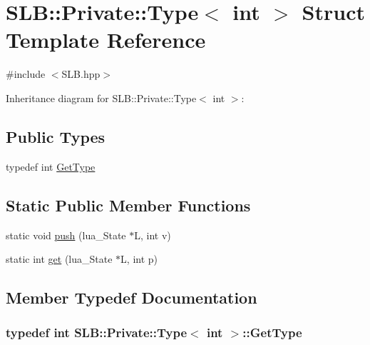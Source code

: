 \hypertarget{structSLB_1_1Private_1_1Type_3_01int_01_4}{}\section{S\+LB\+:\+:Private\+:\+:Type$<$ int $>$ Struct Template Reference}
\label{structSLB_1_1Private_1_1Type_3_01int_01_4}


{\ttfamily \#include $<$S\+L\+B.\+hpp$>$}



Inheritance diagram for S\+LB\+:\+:Private\+:\+:Type$<$ int $>$\+:
\subsection*{Public Types}
\begin{DoxyCompactItemize}
\item 
typedef int \hyperlink{structSLB_1_1Private_1_1Type_3_01int_01_4_afcb454aed68183a3daf14f9e1760adb6}{Get\+Type}
\end{DoxyCompactItemize}
\subsection*{Static Public Member Functions}
\begin{DoxyCompactItemize}
\item 
static void \hyperlink{structSLB_1_1Private_1_1Type_3_01int_01_4_a11161957fce222dbc92cf50ffbebe355}{push} (lua\+\_\+\+State $\ast$L, int v)
\item 
static int \hyperlink{structSLB_1_1Private_1_1Type_3_01int_01_4_ab38cbdf77c223474252c491d1a81ea12}{get} (lua\+\_\+\+State $\ast$L, int p)
\end{DoxyCompactItemize}


\subsection{Member Typedef Documentation}
\subsubsection[{\texorpdfstring{Get\+Type}{GetType}}]{\setlength{\rightskip}{0pt plus 5cm}typedef int {\bf S\+L\+B\+::\+Private\+::\+Type}$<$ int $>$\+::{\bf Get\+Type}}\hypertarget{structSLB_1_1Private_1_1Type_3_01int_01_4_afcb454aed68183a3daf14f9e1760adb6}{}\label{structSLB_1_1Private_1_1Type_3_01int_01_4_afcb454aed68183a3daf14f9e1760adb6}


